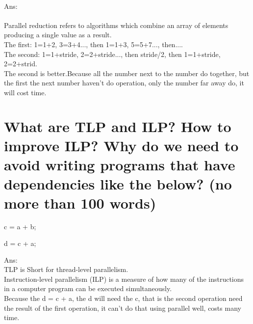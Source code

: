 \documentclass{article}
\begin{document}
\begin{figure}[!htb]
\centering
{}
\end{figure}
~\\
Ans:%
~\\
~\\Parallel reduction refers to algorithms which combine an array of elements producing a single value as a result.
~\\The first: 1=1+2, 3=3+4..., then 1=1+3, 5=5+7..., then....\\The second: 1=1+stride, 2=2+stride..., then stride/2, then 1=1+stride, 2=2+strid.
~\\The second is better.Because all the number next to the number do together, but the first the next number haven't do operation, only the number far away do, it will cost time.
\section{What are TLP and ILP? How to improve ILP? Why do we need to avoid writing programs that have dependencies like the below? (no more than 100 words)}
\qquad \quad c = a + b;

\qquad \quad d = c + a;

Ans:%
~\\TLP is Short for thread-level parallelism.
~\\Instruction-level parallelism (ILP) is a measure of how many of the instructions in a computer program can be executed simultaneously.
~\\Because the d = c + a, the d will need the c, that is the second operation need the result of the first operation, it can't do that using parallel well, costs many time.
\end{document}
